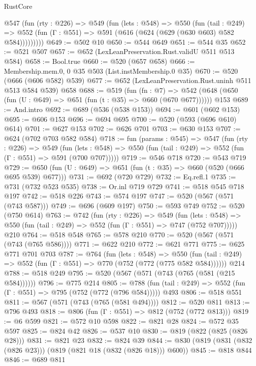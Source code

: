 \begin{lexlean}{RustCore}
\begin{coremodule}
      @547
        (fun (rty : @226) =>
        @549
          (fun (lets : @548) =>
          @550
            (fun (tail : @249) =>
            @552 (fun (Γ : @551) => @591 (@616 (@624 (@629 (@630 @603) @582 @584)))))))))
@649 := @502 @10
@650 := @544 @649
@651 := @544 @35
@652 := @521 @507
@657 := @652 (LexLeanPreservation.Rust.validU @511 @513 @584)
@658 := Bool.true
@660 := @520 (@657 @658)
@666 := Membership.mem.{0, 0} @35 @503 (List.instMembership.{0} @35)
@670 := @520 (@666 (@606 @582) @539)
@677 := @652 (LexLeanPreservation.Rust.uninh @511 @513 @584 @539) @658
@688 := @519
    (fun (fn : @7) =>
    @542 (@648 (@650 (fun (U : @649) => @651 (fun (t : @35) => @660 (@670 @677))))))
    @153
@689 := And.intro
@692 := @689 (@536 (@538 @153))
@694 := @601 (@602 @153)
@695 := @606 @153
@696 := @694 @695
@700 := @520 (@593 (@696 @610) @614)
@701 := @627 @153
@702 := @626 @701
@703 := @630 @153
@707 := @624 (@702 @703 @582 @584)
@718 := fun (params : @545) =>
  @547
    (fun (rty : @226) =>
    @549
      (fun (lets : @548) => @550 (fun (tail : @249) => @552 (fun (Γ : @551) => @591 (@700 @707)))))
@719 := @546 @718
@720 := @543 @719
@729 := @650 (fun (U : @649) => @651 (fun (t : @35) => @660 (@520 (@666 @695 @539) @677)))
@731 := @692 (@720 @729)
@732 := Eq.refl.{1}
@735 := @731 (@732 @523 @535)
@738 := Or.inl @719 @729
@741 := @518 @545 @718 @197
@742 := @518 @226
@743 := @574 @197
@747 := @520 (@567 (@571 (@743 @587)))
@749 := @696 (@609 @197)
@750 := @593 @749
@752 := @520 (@750 @614)
@763 := @742
    (fun (rty : @226) =>
    @549
      (fun (lets : @548) => @550 (fun (tail : @249) => @552 (fun (Γ : @551) => @747 (@752 @707)))))
    @210
@764 := @518 @548
@765 := @578 @210
@770 := @520 (@567 (@571 (@743 (@765 @586))))
@771 := @622 @210
@772 := @621 @771
@775 := @625 @771 @701 @703
@787 := @764
    (fun (lets : @548) =>
    @550 (fun (tail : @249) => @552 (fun (Γ : @551) => @770 (@752 (@772 (@775 @582 @584))))))
    @214
@788 := @518 @249
@795 := @520 (@567 (@571 (@743 (@765 (@581 (@215 @584))))))
@796 := @775 @214
@805 := @788 (fun (tail : @249) => @552 (fun (Γ : @551) => @795 (@752 (@772 (@796 @584))))) @493
@806 := @518 @551
@811 := @567 (@571 (@743 (@765 (@581 @494))))
@812 := @520 @811
@813 := @796 @493
@818 := @806 (fun (Γ : @551) => @812 (@752 (@772 @813)))
@819 := @6 @599
@821 := @572 @10 @598
@822 := @821 @28
@824 := @572 @35 @597
@825 := @824 @42
@826 := @537 @10
@830 := @819 (@822 (@825 (@826 @28)))
@831 := @821 @23
@832 := @824 @39
@844 := @830 (@819 (@831 (@832 (@826 @23))) (@819 (@821 @18 (@832 (@826 @18))) @600))
@845 := @818 @844
@846 := @689 @811

\end{coremodule}
\end{lexlean}
